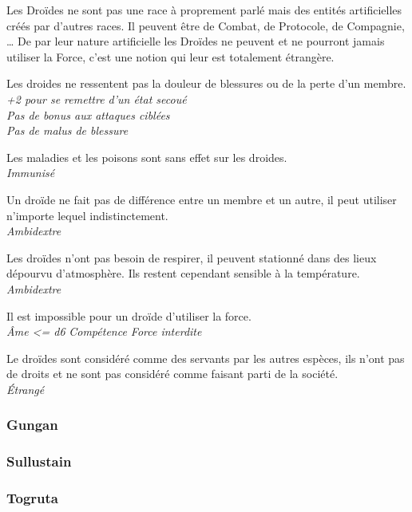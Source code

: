 Les Droïdes ne sont pas une race à proprement parlé mais des entités artificielles créés par d'autres races. Il peuvent être de Combat, de Protocole, de Compagnie, \ldots 
De par leur nature artificielle les Droïdes ne peuvent et ne pourront jamais utiliser la Force, c'est une notion qui leur est totalement étrangère.

\begin{description}[align=left]
\item [Créature artificielle] 	%
		Les droides ne ressentent pas la douleur de blessures ou de la perte d'un membre.\\
		\emph{+2 pour se remettre d'un état secoué}\\
		\emph{Pas de bonus aux attaques ciblées}\\
		\emph{Pas de malus de blessure}
\item [Immunisé] 				%
		Les maladies et les poisons sont sans effet sur les droides.\\
		\emph{Immunisé}
\item [Ambidextre] 				%
		Un droïde ne fait pas de différence entre un membre et un autre, il peut utiliser n'importe lequel indistinctement.\\
		\emph{Ambidextre}
\item [Manque pas d'air] 		%
		Les droïdes n'ont pas besoin de respirer, il peuvent stationné dans des lieux dépourvu d'atmosphère. Ils restent cependant sensible à la température.\\
		\emph{Ambidextre}
\item [Pas d'\^Ame] 			%
		Il est impossible pour un droïde d'utiliser la force.\\
		\emph{\^Ame <= d6}
		\emph{Compétence Force interdite}
\item [Outsider] 				%
		Le droïdes sont considéré comme des servants par les autres espèces, ils n'ont pas de droits et ne sont pas considéré comme faisant parti de la société.\\
		\emph{\'Etrangé}
\end{description}

\subsubsection{Gungan}
\subsubsection{Sullustain}
\subsubsection{Togruta}
